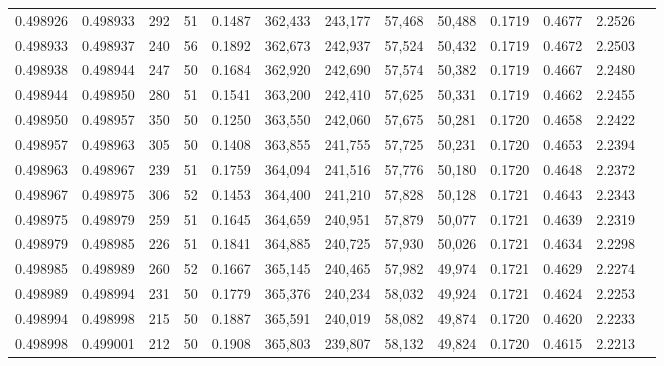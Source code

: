 \begin{tabular}{rrrrrrrrrrrrr}
0.498926 & 0.498933 & 292 &  51 &                                     0.1487 & 362,433 & 243,177 &  57,468 &  50,488 & 0.1719 & 0.4677 & 2.2526 \\
0.498933 & 0.498937 & 240 &  56 &                                     0.1892 & 362,673 & 242,937 &  57,524 &  50,432 & 0.1719 & 0.4672 & 2.2503 \\
0.498938 & 0.498944 & 247 &  50 &                                     0.1684 & 362,920 & 242,690 &  57,574 &  50,382 & 0.1719 & 0.4667 & 2.2480 \\
0.498944 & 0.498950 & 280 &  51 &                                     0.1541 & 363,200 & 242,410 &  57,625 &  50,331 & 0.1719 & 0.4662 & 2.2455 \\
0.498950 & 0.498957 & 350 &  50 &                                     0.1250 & 363,550 & 242,060 &  57,675 &  50,281 & 0.1720 & 0.4658 & 2.2422 \\
0.498957 & 0.498963 & 305 &  50 &                                     0.1408 & 363,855 & 241,755 &  57,725 &  50,231 & 0.1720 & 0.4653 & 2.2394 \\
0.498963 & 0.498967 & 239 &  51 &                                     0.1759 & 364,094 & 241,516 &  57,776 &  50,180 & 0.1720 & 0.4648 & 2.2372 \\
0.498967 & 0.498975 & 306 &  52 &                                     0.1453 & 364,400 & 241,210 &  57,828 &  50,128 & 0.1721 & 0.4643 & 2.2343 \\
0.498975 & 0.498979 & 259 &  51 &                                     0.1645 & 364,659 & 240,951 &  57,879 &  50,077 & 0.1721 & 0.4639 & 2.2319 \\
0.498979 & 0.498985 & 226 &  51 &                                     0.1841 & 364,885 & 240,725 &  57,930 &  50,026 & 0.1721 & 0.4634 & 2.2298 \\
0.498985 & 0.498989 & 260 &  52 &                                     0.1667 & 365,145 & 240,465 &  57,982 &  49,974 & 0.1721 & 0.4629 & 2.2274 \\
0.498989 & 0.498994 & 231 &  50 &                                     0.1779 & 365,376 & 240,234 &  58,032 &  49,924 & 0.1721 & 0.4624 & 2.2253 \\
0.498994 & 0.498998 & 215 &  50 &                                     0.1887 & 365,591 & 240,019 &  58,082 &  49,874 & 0.1720 & 0.4620 & 2.2233 \\
0.498998 & 0.499001 & 212 &  50 &                                     0.1908 & 365,803 & 239,807 &  58,132 &  49,824 & 0.1720 & 0.4615 & 2.2213 \\

\end{tabular}
